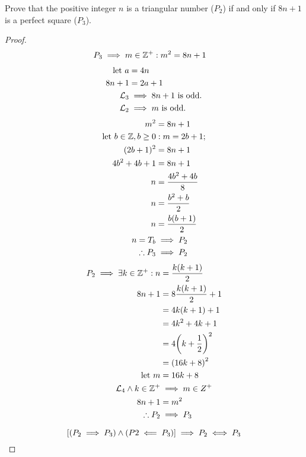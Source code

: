 \pagebreak
\begin{question}

	Prove that the positive integer $n$ is a triangular number ($P_2$) if and only if $8n+1$ is a perfect square ($P_3$).

	\begin{proof}

		\begin{align*}
			P_3 \implies			m \in {\mathbb Z}^{+} & : m^2 = 8n+1
		\end{align*}
		\begin{align*}
			{\text{let } } a       & = 4n                            \\
			8n+1          & = 2a+1                          \\
			\mathcal{L}_3 & \implies {8n+1} \text{ is odd.} \\
			\mathcal{L}_2 & \implies {m} \text{ is odd.}
		\end{align*}
		\begin{align*}
			m^2                     & = 8n + 1            \\
			{\text{let } } b \in {\mathbb Z}, b \ge 0 & : m = 2b + 1;       \\
			(2b+1)^2                & = 8n+1              \\
			4b^2+4b+1               & = 8n+1              \\
			n                       & = \frac{4b^2+4b}{8} \\
			n                       & = \frac{b^2+b}{2}   \\
			n                       & = \frac{b(b+1)}{2}  \\
			n               = T_b   & \implies P_2        \\
			\therefore P_3          & \implies P_ 2
		\end{align*}
		\begin{align*}
			P_2 \implies \exists k \in {\mathbb Z}^{+}  : n & = \frac{k(k+1)}{2}      \\
			8n+1                                   & = 8\frac{k(k+1)}{2} + 1 \\
			                                       & = 4k(k+1) + 1           \\
			                                       & = 4k^2 + 4k +1          \\
			                                       & = 4{ \left(k+\frac{1}{2}\right) }^2 \\
			                                       & = { \left(16k+8\right) }^2          \\
			{\text{let } } m                                & = 16k + 8               \\
			\mathcal{L}_4 \wedge k \in {\mathbb Z}^{+}      & \implies m \in Z^+      \\
			8n + 1                                 & = m^2                   \\
			\therefore			P_2                       & \implies P_3
		\end{align*}

		$$ { \left[ {(P_2 \implies P_3) \wedge (P2 \impliedby P_3)} \right] } \implies P_2 \iff P_3 $$


	\end{proof}

\end{question}
